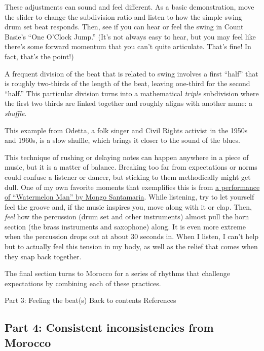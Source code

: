 \documentclass[twoside]{article}
\begin{document}
These adjustments can sound and feel different. As a basic
demonstration, move the slider to change the subdivision ratio and
listen to how the simple swing drum set beat responds. Then, see if you
can hear or feel the swing in Count Basie's ``One O'Clock Jump.'' (It's
not always easy to hear, but you may feel like there's some forward
momentum that you can't quite articulate. That's fine! In fact, that's
the point!)

\hypertarget{example17}{}

A frequent division of the beat that is related to swing involves a
first ``half'' that is roughly two-thirds of the length of the beat,
leaving one-third for the second ``half.'' This particular division
turns into a mathematical \emph{triple} subdivision where the first two
thirds are linked together and roughly aligns with another name: a
\emph{shuffle}.

This example from Odetta, a folk singer and Civil Rights activist in the
1950s and 1960s, is a slow shuffle, which brings it closer to the sound
of the blues.

This technique of rushing or delaying notes can happen anywhere in a
piece of music, but it is a matter of balance. Breaking too far from
expectations or norms could confuse a listener or dancer, but sticking
to them methodically might get dull. One of my own favorite moments that
exemplifies this is from
\href{https://www.youtube.com/embed/zJuX-JJ8WF0}{a performance of
``Watermelon Man'' by Mongo Santamaria}. While listening, try to let
yourself feel the groove and, if the music inspires you, move along with
it or clap. Then, \emph{feel} how the percussion (drum set and other
instruments) almost pull the horn section (the brass instruments and
saxophone) along. It is even more extreme when the percussion drops out
at about 30 seconds in. When I listen, I can't help but to actually feel
this tension in my body, as well as the relief that comes when they snap
back together.

The final section turns to Morocco for a series of rhythms that
challenge expectations by combining each of these practices.

Part 3: Feeling the beat(s) Back to contents References

\hypertarget{part-4-consistent-inconsistencies-from-morocco}{%
\subsection{Part 4: Consistent inconsistencies from
Morocco}\label{part-4-consistent-inconsistencies-from-morocco}}
\end{document}
